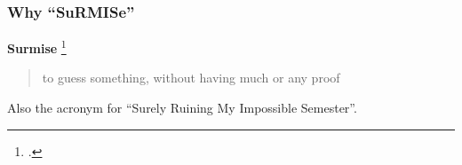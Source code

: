 \appendix

\begin{frame}
	\frametitle{Why ``SuRMISe''}
	\textbf{Surmise} \footcite{surmise}
	\begin{quote}
		to guess something, without having much or any proof
	\end{quote}
	\par
	\vspace{1cm}
	Also the acronym for ``\alert{Su}rely \alert{R}uining \alert{M}y \alert{I}mpossible \alert{Se}mester''.
\end{frame}